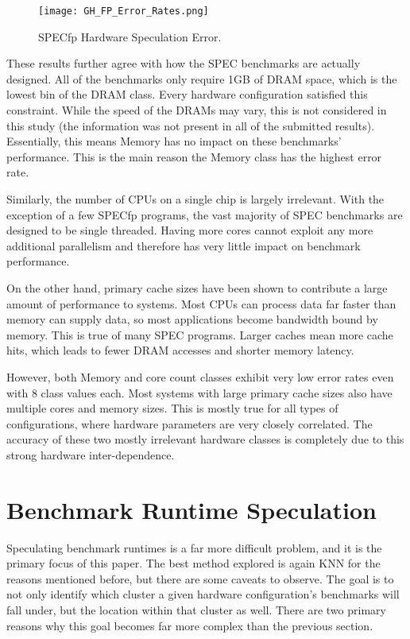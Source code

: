 \documentclass[10pt,twocolumn,letterpaper]{article}
\begin{document}
\begin{figure}[t]
\centering
\texttt{[image: GH\_FP\_Error\_Rates.png]}
\caption{SPECfp Hardware Speculation Error.}
\label{fig:GHfpError}
\end{figure}

These results further agree with how the SPEC benchmarks are actually designed.
All of the benchmarks only require 1GB of DRAM space, which is the lowest bin of the DRAM class.
Every hardware configuration satisfied this constraint.
While the speed of the DRAMs may vary, this is not considered in this study (the information was not present in all of the submitted results).
Essentially, this means Memory has no impact on these benchmarks’ performance.
This is the main reason the Memory class has the highest error rate.

Similarly, the number of CPUs on a single chip is largely irrelevant.
With the exception of a few SPECfp programs, the vast majority of SPEC benchmarks are designed to be single threaded.
Having more cores cannot exploit any more additional parallelism and therefore has very little impact on benchmark performance.

On the other hand, primary cache sizes have been shown to contribute a large amount of performance to systems.
Most CPUs can process data far faster than memory can supply data, so most applications become bandwidth bound by memory.
This is true of many SPEC programs.
Larger caches mean more cache hits, which leads to fewer DRAM accesses and shorter memory latency.

However, both Memory and core count classes exhibit very low error rates even with 8 class values each.
Most systems with large primary cache sizes also have multiple cores and memory sizes.
This is mostly true for all types of configurations, where hardware parameters are very closely correlated.
The accuracy of these two mostly irrelevant hardware classes is completely due to this strong hardware inter-dependence.

\section{Benchmark Runtime Speculation}

Speculating benchmark runtimes is a far more difficult problem, and it is the primary focus of this paper.
The best method explored is again KNN for the reasons mentioned before, but there are some caveats to observe.
The goal is to not only identify which cluster a given hardware configuration’s benchmarks will fall under, but the location within that cluster as well.
There are two primary reasons why this goal becomes far more complex than the previous section.
\end{document}
